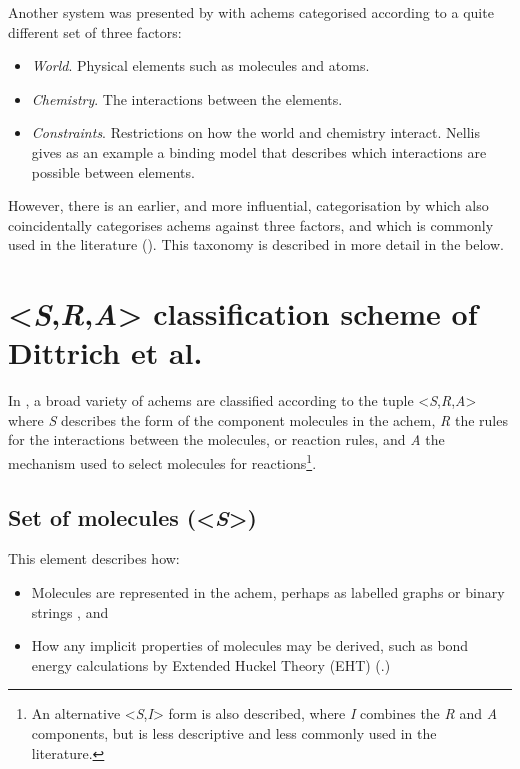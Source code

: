 Another system was presented by \textcite[p.132]{Nellis2012} with \glspl{achem} categorised according to a quite different set of three factors:
\begin{itemize}
	\item \emph{World}. Physical elements such as molecules and atoms.
	\item \emph{Chemistry}. The interactions between the elements.
	\item \emph{Constraints}. Restrictions on how the world and chemistry interact. Nellis gives as an example a binding model that describes which interactions are possible between elements.
\end{itemize}

However, there is an earlier, and more influential, categorisation by \textcite{Dittrich:2001zr} which also coincidentally categorises \glspl{achem} against three factors, and which is commonly used in the literature (\eg \textcite{Lenaerts2009,Gardiner2007}). This taxonomy is described in more detail in the  below.

\section{\textless{}\emph{S},\emph{R},\emph{A}\textgreater{} classification scheme of Dittrich et al.}\label{dittrich}

In \textcite{Dittrich:2001zr}, a broad variety of \glspl{achem} are classified according to the tuple \textless{}\emph{S},\emph{R},\emph{A}\textgreater{} where \emph{S} describes the form of the component molecules in the \gls{achem}, \emph{R} the rules for the interactions between the molecules, or reaction rules, and \emph{A} the mechanism used to select molecules for reactions\footnote{An alternative \textless{}\emph{S},\emph{I}\textgreater{} form is also described, where \emph{I} combines the \emph{R} and \emph{A} components, but is less descriptive and less commonly used in the literature.}. 

\subsection{Set of molecules (\textless{}\emph{S}\textgreater{})}

This element describes how:
\begin{itemize}
	\item Molecules are represented in the \gls{achem}, perhaps as labelled graphs \parencite{Faulconbridge2011} or binary strings \parencite{Banzhaf94}, and
	\item How any implicit properties of molecules may be derived, such as bond energy calculations by Extended Huckel Theory (EHT) (\eg \textcite{Benko2003}.)
\end{itemize} 

